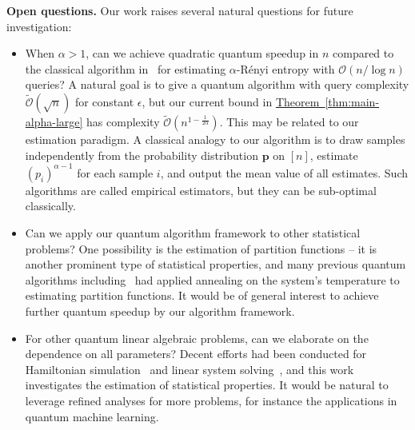 \documentclass[journal]{IEEEtran}
\newcommand{\thm}[1]{\hyperref[thm:#1]{Theorem~\ref*{thm:#1}}}
\begin{document}
\vspace{3mm}
\noindent
\textbf{Open questions.}
Our work raises several natural questions for future investigation:
\begin{itemize}[leftmargin=*]
\item When $\alpha>1$, can we achieve quadratic quantum speedup in $n$ compared to the classical algorithm in~\cite{acharya2016estimating} for estimating $\alpha$-R{\'e}nyi entropy with $\mathcal{O}(n/\log n)$ queries? A natural goal is to give a quantum algorithm with query complexity $\widetilde{\mathcal{O}}(\sqrt{n})$ for constant $\epsilon$, but our current bound in \thm{main-alpha-large} has complexity $\widetilde{\mathcal{O}}(n^{1-\frac{1}{2\alpha}})$.
This may be related to our estimation paradigm. A classical analogy to our algorithm is to draw samples independently from the probability distribution $\mathbf{p}$ on $[n]$, estimate $(p_i)^{\alpha-1}$ for each sample $i$, and output the mean value of all estimates. Such algorithms are called empirical estimators, but they can be sub-optimal classically. 


\item Can we apply our quantum algorithm framework to other statistical problems? One possibility is the estimation of partition functions -- it is another prominent type of statistical properties, and many previous quantum algorithms including~\cite{wocjan2009quantum,montanaro2015quantum,chakrabarti2023quantum,harrow2020adaptive,arunachalam2021simpler} had applied annealing on the system's temperature to estimating partition functions. It would be of general interest to achieve further quantum speedup by our algorithm framework.

\item For other quantum linear algebraic problems, can we elaborate on the dependence on all parameters? Decent efforts had been conducted for Hamiltonian simulation~\cite{low2017optimal,low2019hamiltonian,gilyen2019singular} and linear system solving~\cite{harrow2009quantum,ambainis2012variable,childs2017,chakraborty2019linear}, and this work investigates the estimation of statistical properties. It would be natural to leverage refined analyses for more problems, for instance the applications in quantum machine learning.
\end{itemize}
\end{document}
